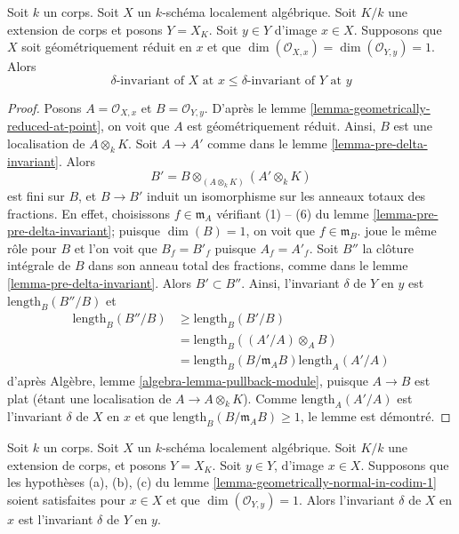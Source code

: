 \begin{lemma}
\label{lemma-delta-invariant-and-change-of-fields}
Soit $k$ un corps. Soit $X$ un $k$-schéma localement algébrique.
Soit $K/k$ une extension de corps et posons $Y = X_K$.
Soit $y \in Y$ d'image $x \in X$.
Supposons que $X$ soit géométriquement réduit en $x$ et que
$\dim(\mathcal{O}_{X, x}) = \dim(\mathcal{O}_{Y, y}) = 1$.
Alors
$$
\delta\text{-invariant of }X\text{ at }x \leq
\delta\text{-invariant of }Y\text{ at }y
$$
\end{lemma}

\begin{proof}
Posons $A = \mathcal{O}_{X, x}$ et $B = \mathcal{O}_{Y, y}$.
D'après le lemme \ref{lemma-geometrically-reduced-at-point},
on voit que $A$ est géométriquement réduit.
Ainsi, $B$ est une localisation de $A \otimes_k K$.
Soit $A \to A'$ comme dans le lemme \ref{lemma-pre-delta-invariant}.
Alors
$$
B' = B \otimes_{(A \otimes_k K)} (A' \otimes_k K)
$$
est fini sur $B$, et $B \to B'$ induit
un isomorphisme sur les anneaux totaux des fractions. En effet, choisissons $f \in \mathfrak m_A$
vérifiant (1) -- (6) du lemme \ref{lemma-pre-pre-delta-invariant};
puisque $\dim(B) = 1$, on voit que $f \in \mathfrak m_B$.
joue le même rôle pour $B$ et l'on voit que $B_f = B'_f$ puisque $A_f = A'_f$.
Soit $B''$ la clôture intégrale de $B$ dans son
anneau total des fractions, comme dans le lemme \ref{lemma-pre-delta-invariant}.
Alors $B' \subset B''$. Ainsi, l'invariant $\delta$ de $Y$ en $y$ est
$\text{length}_B(B''/B)$ et
\begin{align*}
\text{length}_B(B''/B)
& \geq
\text{length}_B(B'/B) \\
& =
\text{length}_B((A'/A) \otimes_A B) \\
& =
\text{length}_B(B/\mathfrak m_A B) \text{length}_A(A'/A)
\end{align*}
d'après Algèbre, lemme \ref{algebra-lemma-pullback-module},
puisque $A \to B$ est plat (étant une localisation de $A \to A \otimes_k K$).
Comme $\text{length}_A(A'/A)$ est l'invariant $\delta$ de $X$ en $x$
et que
$\text{length}_B(B/\mathfrak m_A B) \geq 1$, le lemme est démontré.
\end{proof}

\begin{lemma}
\label{lemma-delta-invariant-and-change-of-fields-better}
Soit $k$ un corps. Soit $X$ un $k$-schéma localement algébrique.
Soit $K/k$ une extension de corps, et posons $Y = X_K$.
Soit $y \in Y$, d'image $x \in X$.
Supposons que les hypothèses (a), (b), (c) du
lemme \ref{lemma-geometrically-normal-in-codim-1}
soient satisfaites pour $x \in X$ et que $\dim(\mathcal{O}_{Y, y}) = 1$.
Alors l'invariant $\delta$
de $X$ en $x$ est l'invariant $\delta$ de $Y$ en $y$.
\end{lemma}

